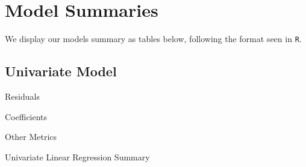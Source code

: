 \documentclass[11pt,a4paper]{article}
\begin{document}
\section{Model Summaries}

We display our models summary as tables below, following the format seen in
\verb|R|.

\subsection{Univariate Model}
\begin{table}[H]
    \centering
    \begin{subtable}{.7\linewidth}
        \centering
        \caption{Residuals}
    \end{subtable}%

    \vspace{1em} %

    \begin{subtable}{.7\linewidth}
        \centering
        \caption{Coefficients}
    \end{subtable}%

    \vspace{1em}

    

    \vspace{1em} %

    \begin{subtable}{.7\linewidth}
        \centering
        \caption{Other Metrics}
    \end{subtable}

    \caption{Univariate Linear Regression Summary}
    \label{table: p1}
\end{table}
\end{document}
